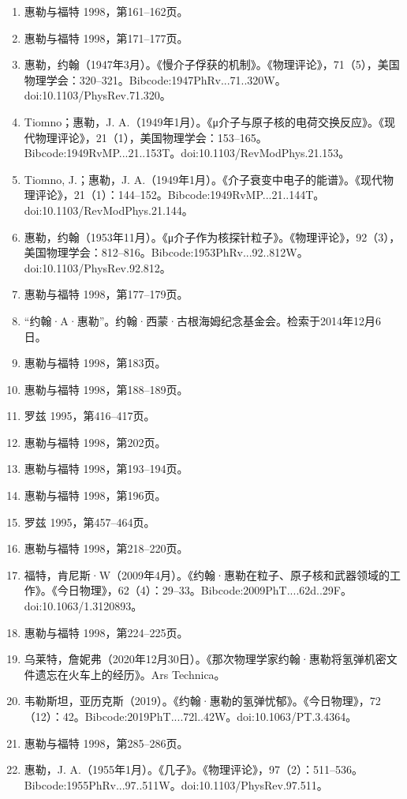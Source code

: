 \begin{enumerate}
\item 惠勒与福特 1998，第161–162页。
\item 惠勒与福特 1998，第171–177页。
\item 惠勒，约翰（1947年3月）。《慢介子俘获的机制》。《物理评论》，71（5），美国物理学会：320–321。Bibcode:1947PhRv...71..320W。doi:10.1103/PhysRev.71.320。
\item Tiomno；惠勒，J. A.（1949年1月）。《μ介子与原子核的电荷交换反应》。《现代物理评论》，21（1），美国物理学会：153–165。Bibcode:1949RvMP...21..153T。doi:10.1103/RevModPhys.21.153。
\item Tiomno, J.；惠勒，J. A.（1949年1月）。《介子衰变中电子的能谱》。《现代物理评论》，21（1）：144–152。Bibcode:1949RvMP...21..144T。doi:10.1103/RevModPhys.21.144。
\item 惠勒，约翰（1953年11月）。《μ介子作为核探针粒子》。《物理评论》，92（3），美国物理学会：812–816。Bibcode:1953PhRv...92..812W。doi:10.1103/PhysRev.92.812。
\item 惠勒与福特 1998，第177–179页。
\item “约翰·A·惠勒”。约翰·西蒙·古根海姆纪念基金会。检索于2014年12月6日。
\item 惠勒与福特 1998，第183页。
\item 惠勒与福特 1998，第188–189页。
\item 罗兹 1995，第416–417页。
\item 惠勒与福特 1998，第202页。
\item 惠勒与福特 1998，第193–194页。
\item 惠勒与福特 1998，第196页。
\item 罗兹 1995，第457–464页。
\item 惠勒与福特 1998，第218–220页。
\item 福特，肯尼斯·W（2009年4月）。《约翰·惠勒在粒子、原子核和武器领域的工作》。《今日物理》，62（4）：29–33。Bibcode:2009PhT....62d..29F。doi:10.1063/1.3120893。
\item 惠勒与福特 1998，第224–225页。
\item 乌莱特，詹妮弗（2020年12月30日）。《那次物理学家约翰·惠勒将氢弹机密文件遗忘在火车上的经历》。Ars Technica。
\item 韦勒斯坦，亚历克斯（2019）。《约翰·惠勒的氢弹忧郁》。《今日物理》，72（12）：42。Bibcode:2019PhT....72l..42W。doi:10.1063/PT.3.4364。
\item 惠勒与福特 1998，第285–286页。
\item 惠勒，J. A.（1955年1月）。《几子》。《物理评论》，97（2）：511–536。Bibcode:1955PhRv...97..511W。doi:10.1103/PhysRev.97.511。

\end{enumerate}
